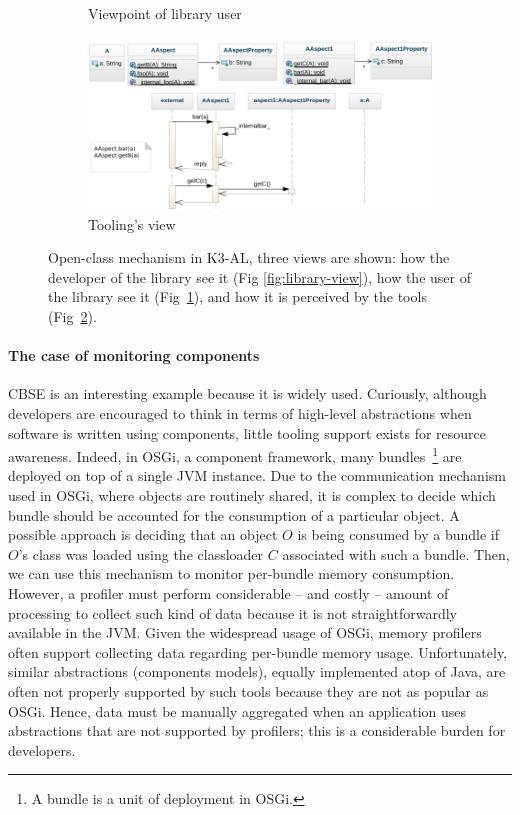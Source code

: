\begin{figure}[ht]
\begin{subfigure}[b]{0.45\textwidth}
\caption{Viewpoint of library user}\label{fig:user-view}
\end{subfigure}
\begin{subfigure} {\linewidth}
\centering
\includegraphics[width=0.9\linewidth]{chapter2/fig/tooling-view.png}
\caption{Tooling's view}\label{fig:tooling-view}
\end{subfigure}
\caption{Open-class mechanism in K3-AL, three views are shown: how the developer of the library see it (Fig \ref{fig:library-view}), how the user of the library see it (Fig~\ref{fig:user-view}), and how it is perceived by the tools (Fig~\ref{fig:tooling-view}).}
\label{fig:k3-diagram}
\end{figure}


\paragraph{The case of monitoring components}

\gls{CBSE} is an interesting example because it is widely used.
Curiously, although developers are encouraged to think in terms of high-level abstractions when software is written using components, little tooling support exists for resource awareness.
Indeed, in OSGi, a component framework, many bundles~\footnote{A bundle is a unit of deployment in OSGi.} are deployed on top of a single JVM instance.
Due to the communication mechanism used in OSGi, where objects are routinely shared, it is complex to decide which bundle should be accounted for the consumption of a particular object.
A possible approach is deciding that an object $O$ is being consumed by a bundle if $O$'s class was loaded using the classloader $C$ associated with such a bundle.
Then, we can use this mechanism to monitor per-bundle memory consumption. 
However, a profiler must perform considerable -- and costly -- amount of processing to collect such kind of data because it is not straightforwardly available in the JVM. 
Given the widespread usage of OSGi, memory profilers often support collecting data regarding per-bundle memory usage.
Unfortunately, similar abstractions (components models), equally implemented atop of Java, are often not properly supported by such tools because they are not as popular as OSGi.
Hence, data must be manually aggregated when an application uses abstractions that are not supported by profilers; this is a considerable burden for developers.

